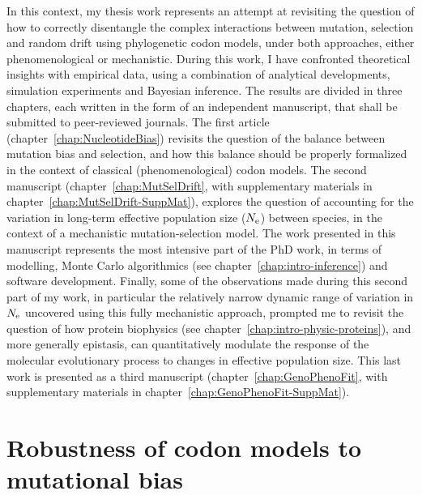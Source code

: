 In this context, my thesis work represents an attempt at revisiting the question of how to correctly disentangle the complex interactions between mutation, selection and random drift using phylogenetic \gls{codon} models, under both approaches, either phenomenological or mechanistic.
During this work, I have confronted theoretical insights with empirical data, using a combination of analytical developments, simulation experiments and Bayesian inference.
The results are divided in three chapters, each written in the form of an independent manuscript, that shall be submitted to peer-reviewed journals.
The first article (chapter~\ref{chap:NucleotideBias}) revisits the question of the balance between mutation bias and selection, and how this balance should be properly formalized in the context of classical (phenomenological) \gls{codon} models.
The second manuscript (chapter~\ref{chap:MutSelDrift}, with supplementary materials in chapter~\ref{chap:MutSelDrift-SuppMat}), explores the question of accounting for the variation in long-term \gls{effective population size} ($N_{\text{e}}$) between species, in the context of a mechanistic mutation-selection model.
The work presented in this manuscript represents the most intensive part of the PhD work, in terms of modelling, Monte Carlo algorithmics (see chapter~\ref{chap:intro-inference}) and software development.
Finally, some of the observations made during this second part of my work, in particular the relatively narrow dynamic range of variation in $N_{\text{e}}$ uncovered using this fully mechanistic approach, prompted me to revisit the question of how protein biophysics (see chapter~\ref{chap:intro-physic-proteins}), and more generally epistasis, can quantitatively modulate the response of the molecular evolutionary process to changes in \gls{effective population size}.
This last work is presented as a third manuscript (chapter~\ref{chap:GenoPhenoFit}, with supplementary materials in chapter~\ref{chap:GenoPhenoFit-SuppMat}).


\section{Robustness of codon models to mutational bias}
\label{sec-goals:NucleotideBias}

